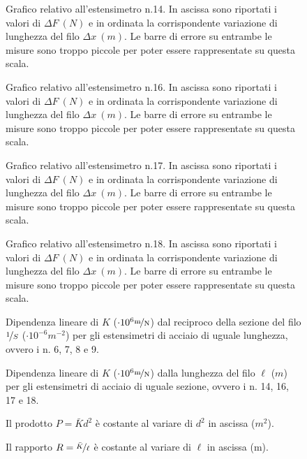 \documentclass[italian,a4paper]{article}
\begin{document}
\begin{figure}[p]\caption{Grafico relativo all'estensimetro n.14. In ascissa sono riportati i valori di $\Delta F~(\unit{N})$ e in ordinata la corrispondente variazione di lunghezza del filo $\Delta x~(\unit{m})$. Le barre di errore su entrambe le misure sono troppo piccole per poter essere rappresentate su questa scala.}\label{14}

\end{figure}
\begin{figure}[p]\caption{Grafico relativo all'estensimetro n.16. In ascissa sono riportati i valori di $\Delta F~(\unit{N})$ e in ordinata la corrispondente variazione di lunghezza del filo $\Delta x~(\unit{m})$. Le barre di errore su entrambe le misure sono troppo piccole per poter essere rappresentate su questa scala.}\label{16}

\end{figure}
\begin{figure}[p]\caption{Grafico relativo all'estensimetro n.17. In ascissa sono riportati i valori di $\Delta F~(\unit{N})$ e in ordinata la corrispondente variazione di lunghezza del filo $\Delta x~(\unit{m})$. Le barre di errore su entrambe le misure sono troppo piccole per poter essere rappresentate su questa scala.}\label{17}

\end{figure}
\begin{figure}[p]\caption{Grafico relativo all'estensimetro n.18. In ascissa sono riportati i valori di $\Delta F~(\unit{N})$ e in ordinata la corrispondente variazione di lunghezza del filo $\Delta x~(\unit{m})$. Le barre di errore su entrambe le misure sono troppo piccole per poter essere rappresentate su questa scala.}\label{18}

\end{figure}
\begin{figure}[p]\caption{Dipendenza lineare di $K$ ($\cdot 10^6 \unitfrac m N$) dal reciproco della sezione del filo $\nicefrac 1 S$ ($\cdot 10^{-6} \unit{m^{-2}}$) per gli estensimetri di acciaio di uguale lunghezza, ovvero i n. 6, 7, 8 e 9.}\label{kes}

\end{figure}
\begin{figure}[p]\caption{Dipendenza lineare di $K$ ($\cdot 10^6 \unitfrac m N$) dalla lunghezza del filo $\ell$ ($\unit{m}$) per gli estensimetri di acciaio di uguale sezione, ovvero i n. 14, 16, 17 e 18.}\label{kel}

\end{figure}
\begin{figure}[p]\caption{Il prodotto $P = \bar{K}d^2$ è costante al variare di $d^2$ in ascissa ($\unit{m^2}$).}\label{P}

\end{figure}
\begin{figure}[p]\caption{Il rapporto $R = \nicefrac{\bar{K}}{\ell}$ è costante al variare di $\ell$ in ascissa (\unit{m}).}\label{R}

\end{figure}

\end{document}
